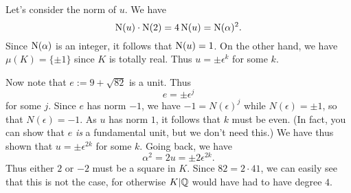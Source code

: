 Let's consider the norm of $u$.
We have
\[ \operatorname{N}(u) \cdot \operatorname{N}(2) = 4 \operatorname{N}(u) = \operatorname{N}(\alpha)^{2}. \]
Since $\operatorname{N}(\alpha)$ is an integer, it follows that $\operatorname{N}(u) = 1$.
On the other hand, we have $\mu(K) = \{\pm 1\}$ since $K$ is totally real.
Thus $u = \pm \epsilon^{k}$ for some $k$.

Now note that $e := 9 + \sqrt{82}$ is a unit.
Thus
\[ e = \pm \epsilon^{j} \]
for some $j$.
Since $e$ has norm $-1$, we have $-1 = N(\epsilon)^{j}$ while $N(\epsilon) = \pm 1$, so that $N(\epsilon) = -1$.
As $u$ has norm $1$, it follows that $k$ must be even.
(In fact, you can show that $e$ \emph{is} a fundamental unit, but we don't need this.)
We have thus shown that $u = \pm \epsilon^{2k}$ for some $k$.
Going back, we have
\[ \alpha^{2} = 2u = \pm 2\epsilon^{2k}. \]
Thus either $2$ or $-2$ must be a square in $K$.
Since $82 = 2 \cdot 41$, we can easily see that this is not the case, for otherwise $K|\mathbb{Q}$ would have had to have degree $4$.

